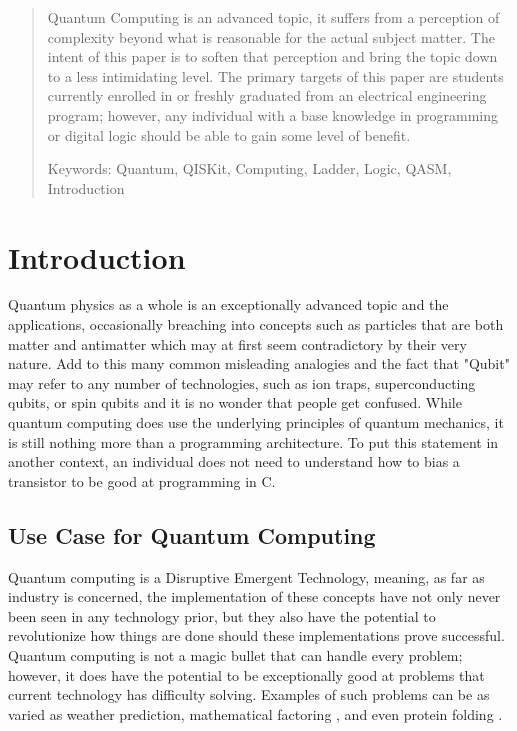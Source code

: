 \documentclass[a4paper]{article}
\newcommand{\tabhere}{} %
\begin{document}
	\begin{abstract}
		
		Quantum Computing is an advanced topic, it suffers from a perception of complexity beyond what is reasonable for the actual subject matter.  The intent of this paper is to soften that perception and bring the topic down to a less intimidating level.  The primary targets of this paper are students currently enrolled in or freshly graduated from an electrical engineering program; however, any individual with a base knowledge in programming or digital logic should be able to gain some level of benefit. 
		
		Keywords:  Quantum, QISKit, Computing, Ladder, Logic, QASM, Introduction
	\end{abstract}
\newpage


\tableofcontents %
\newpage %
\section{Introduction}
\label{sec:introduction} %
\tabhere Quantum physics as a whole is an exceptionally advanced topic and the applications, occasionally breaching into concepts such as particles that are both matter and antimatter\cite{mindBoggle} which may at first seem contradictory by their very nature.  Add to this many common misleading analogies and the fact that "Qubit" may refer to any number of technologies, such as ion traps, superconducting qubits, or spin qubits and it is no wonder that people get confused.  While quantum computing does use the underlying principles of quantum mechanics, it is still nothing more than a programming architecture.  To put this statement in another context, an individual does not need to understand how to bias a transistor to be good at programming in C.

\subsection{Use Case for Quantum Computing}%
\tabhere Quantum computing is a Disruptive Emergent Technology, meaning, as far as industry is concerned, the implementation of these concepts have not only never been seen in any technology prior, but they also have the potential to revolutionize how things are done should these implementations prove successful.  Quantum computing is not a magic bullet that can handle every problem; however, it does have the potential to be exceptionally good at problems that current technology has difficulty solving.  Examples of such problems can be as varied as weather prediction, mathematical factoring \cite{shorsAlgorithm}, and even protein folding \cite{dwavepfold}. 
\end{document}
